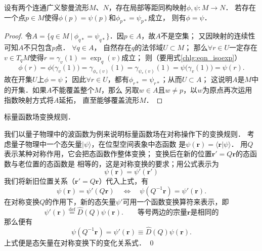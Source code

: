 \begin{proposition}\label{chlg:thm_isopall}
    设有两个连通广义黎曼流形$M$、$N$，存在局部等距同构映射$\phi,\psi:M\to N$．
    若存在一个点$p\in M$使得$\phi(p)=\psi(p)$和$\phi_{p*} = \psi_{p*}$成立，
    则有$\phi=\psi$．
\end{proposition}
\begin{proof}
    令$A=\{ q\in M \ | \  \phi_{q*} = \psi_{q*}\}$．因$p\in A$，故$A$不是空集；
    又因映射的连续性可知$A$不只包含$p$点．    $\forall q\in A$，
    自然存在$q$的法邻域$U\subset M$；
    那么$\forall r\in U$一定存在$v\in T_q M$使得$r=\gamma_v(1)=\exp_q(v)$成立；
    则（要用式\eqref{chlg:eqn_isoexp}）
    \begin{equation}
        \phi(r) = \phi \bigl(\gamma_v(1)\bigr)= \gamma_{\phi_*(v)} (1)
        = \gamma_{\psi_*(v)} (1) =\psi \bigl(\gamma_v(1)\bigr) =\psi(r).
    \end{equation}
    故在开集$U$上$\phi=\psi$；
    因此$\forall r\in U$，都有$\phi_{r*} = \psi_{r*}$；从而$U\subset A$；
    这说明$A$是$M$中的开集．如果$A$不能覆盖整个$M$，那么
    另取$w\in A$且$w\neq p$，以$w$为原点再次运用指数映射方式将$A$延拓，
    直至能够覆盖流形$M$．
\end{proof}

\begin{example}\label{chlg:exam_DQpsi}
    标量函数场变换规则．
\end{example}      
我们以量子物理中的波函数为例来说明标量函数场在对称操作下的变换规则．
考虑量子物理中一个态矢量$|\psi\rangle$，在位型空间表象中态函数
是$\psi(\boldsymbol{r}) = \langle \boldsymbol{r}|\psi\rangle$．
用$Q$表示某种对称作用，它会把态函数作整体变换；
变换后在新的位置$\boldsymbol{r}'=Q \boldsymbol{r}$的态函数与老位置的态函数是
相等的，这是对称变换的要求；用公式表示为
\begin{equation*}
    \psi(\boldsymbol{r}) = \psi'(\boldsymbol{r}')
\end{equation*}
我们将新旧位置关系（$\boldsymbol{r}'=Q \boldsymbol{r}$）代入上式，有
\begin{equation*}
    \psi(\boldsymbol{r}) = \psi'(Q \boldsymbol{r}) \quad \Leftrightarrow \quad
    \psi(Q^{-1}\boldsymbol{r}) = \psi'(\boldsymbol{r}) .
\end{equation*}
在对称变换$Q$的作用下，新的态矢量$\psi'$可用一个函数变换算符来表示，即
\begin{equation}\label{chlg:eqn_psip2psi}
    \psi'(\boldsymbol{r}) \overset{\mathrm {def}}{=}\hat{D}(Q)\psi(\boldsymbol{r}).
    \qquad \text{等号两边的宗量$\boldsymbol{r}$是相同的}
\end{equation}
那么便有
\begin{equation}\label{chlg:eqn_DQpsi}
    \psi(Q^{-1}\boldsymbol{r})  = \psi'(\boldsymbol{r}) \equiv \hat{D}(Q)\psi(\boldsymbol{r}) .
\end{equation}
上式便是态矢量在对称变换下的变化关系式．    \qed


